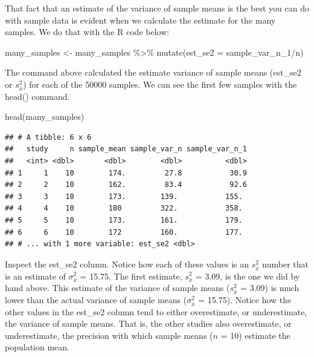 \documentclass[
]{krantz}
\makeatletter
\newenvironment{Shaded}{\begin{snugshade}}{\end{snugshade}}
\newcommand{\AttributeTok}[1]{\textcolor[rgb]{0.61,0.61,0.61}{#1}}
\newcommand{\FunctionTok}[1]{\textcolor[rgb]{0,0,0}{#1}}
\newcommand{\NormalTok}[1]{#1}
\newcommand{\OtherTok}[1]{\textcolor[rgb]{0.37,0.37,0.37}{#1}}
\newcommand{\SpecialCharTok}[1]{\textcolor[rgb]{0,0,0}{#1}}
\newenvironment{kframe}{%
\medskip{}
\setlength{\fboxsep}{.8em}
 \def\at@end@of@kframe{}%
 \ifinner\ifhmode%
  \def\at@end@of@kframe{\end{minipage}}%
  \begin{minipage}{\columnwidth}%
 \fi\fi%
 \def\FrameCommand##1{\hskip\@totalleftmargin \hskip-\fboxsep
 \colorbox{shadecolor}{##1}\hskip-\fboxsep
     \hskip-\linewidth \hskip-\@totalleftmargin \hskip\columnwidth}%
 \MakeFramed {\advance\hsize-\width
   \@totalleftmargin\z@ \linewidth\hsize
   \@setminipage}}%
 {\par\unskip\endMakeFramed%
 \at@end@of@kframe}
\renewenvironment{Shaded}{\begin{kframe}}{\end{kframe}}
\makeatother
\begin{document}
That fact that an estimate of the variance of sample means is the best you can do with sample data is evident when we calculate the estimate for the many samples. We do that with the R code below:

\begin{Shaded}
\begin{Highlighting}[]
\NormalTok{many\_samples }\OtherTok{\textless{}{-}}\NormalTok{ many\_samples }\SpecialCharTok{\%\textgreater{}\%} 
   \FunctionTok{mutate}\NormalTok{(}\AttributeTok{est\_se2 =}\NormalTok{ sample\_var\_n\_1}\SpecialCharTok{/}\NormalTok{n)}
\end{Highlighting}
\end{Shaded}

The command above calculated the estimate variance of sample means (est\_se2 or \(s_{\bar{x}}^2\)) for each of the 50000 samples. We can see the first few samples with the head() command.

\begin{Shaded}
\begin{Highlighting}[]
\FunctionTok{head}\NormalTok{(many\_samples)}
\end{Highlighting}
\end{Shaded}

\begin{verbatim}
## # A tibble: 6 x 6
##   study     n sample_mean sample_var_n sample_var_n_1
##   <int> <dbl>       <dbl>        <dbl>          <dbl>
## 1     1    10        174.         27.8           30.9
## 2     2    10        162.         83.4           92.6
## 3     3    10        173.        139.           155. 
## 4     4    10        180         322.           358. 
## 5     5    10        173.        161.           179. 
## 6     6    10        172         160.           177. 
## # ... with 1 more variable: est_se2 <dbl>
\end{verbatim}

Inspect the est\_se2 column. Notice how each of these values is an \(s_{\bar{x}}^2\) number that is an estimate of \(\sigma_{\bar{x}}^2\) = 15.75. The first estimate, \(s_{\bar{x}}^2\) = 3.09, is the one we did by hand above. This estimate of the variance of sample means (\(s_{\bar{x}}^2\) = 3.09) is much lower than the actual variance of sample means (\(\sigma_{\bar{x}}^2\) = 15.75). Notice how the other values in the est\_se2 column tend to either overestimate, or underestimate, the variance of sample means. That is, the other studies also overestimate, or underestimate, the precision with which sample means (\(n\) = 10) estimate the population mean.
\end{document}
